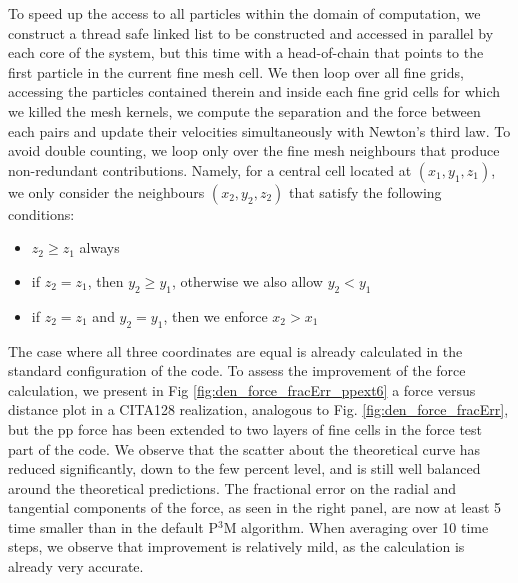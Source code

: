  To speed up the access to all particles within the domain of computation, we construct a thread safe linked list
 to be constructed and accessed in parallel by each core of the system, but this time with a head-of-chain that points to the first particle in the current fine mesh cell. We then loop over all fine grids, accessing the particles contained therein and inside each fine grid cells for which we killed the mesh kernels,
 we compute the separation and the force between each pairs and update their velocities simultaneously with Newton's third law. 
 To avoid double counting, we loop only over the fine mesh neighbours that produce non-redundant contributions. Namely, for a central cell located at 
 $(x_1, y_1, z_1)$, we only consider the neighbours $(x_2, y_2, z_2)$ that satisfy the following conditions:
 \begin{itemize}
 \item{$z_2 \ge z_1$ always}
 \item{if $z_2 = z_1$, then $y_2 \ge y_1$, otherwise we also allow $y_2 < y_1$} 
 \item{if $z_2 = z_1$ and $y_2 = y_1$, then we enforce $x_2 > x_1$}
 \end{itemize}
 The case where all three coordinates are equal is already calculated in the standard configuration of the code.
 To assess the improvement of the force calculation, we present in Fig \ref{fig:den_force_fracErr_ppext6} a force versus distance
 plot in a CITA128 realization, analogous to Fig. \ref{fig:den_force_fracErr}, but the pp force has been extended to  two layers of fine cells
 in the force test part of the code. 
 We observe that the scatter about the theoretical curve has reduced significantly, down to the few percent level, 
 and is still well balanced around the theoretical predictions.
 The fractional error on the radial and tangential components of the force, as seen in the right panel,
 are now at least 5 time smaller than in the default P$^{3}$M algorithm.
 When averaging over 10 time steps, we observe that improvement is relatively mild, as the calculation is already very accurate. 
 
